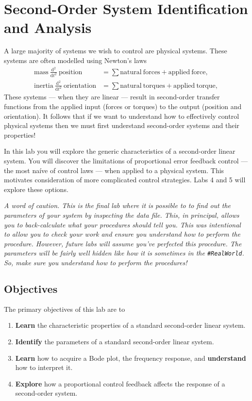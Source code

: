 \chapter{Second-Order System Identification and Analysis}\label{Lab:2}
A large majority of systems we wish to control are physical systems. These
systems are often modelled using Newton's laws
\[
\begin{aligned}
  \mathrm{mass}~\frac{\mathrm d^2}{\mathrm{d}t^2}~\mathrm{position}
    &= \sum \mathrm{natural~forces} + \mathrm{applied~force},\\
  \mathrm{inertia}~\frac{\mathrm d^2}{\mathrm{d}t^2}~\mathrm{orientation}
    &= \sum \mathrm{natural~torques} + \mathrm{applied~torque},
\end{aligned}
\]
These systems --- when
they are linear --- result in second-order transfer functions from the
applied input (forces or torques) to the output (position and orientation).
It follows that if we want to understand how to effectively control physical
systems then we must first understand second-order systems and their
properties!

In this lab you will explore the generic characteristics of a second-order
linear system. You will discover the limitations of proportional error
feedback control --- the most na\'ive of control laws --- when applied to
a physical system. This motivates consideration of
more complicated control strategies. Labs 4 and 5 will explore these options.

\emph{A word of caution. This is the final lab where it is possible to
to find out the parameters of your system by inspecting the data file.
This, in principal, allows you to back-calculate what your procedures should
tell you. This was intentional to allow
you to check your work and ensure you understand how to perform the procedure.
However, future labs will assume you've perfected this procedure.
The parameters will be fairly well hidden like how it is sometimes in the
\texttt{\#RealWorld}. So, make sure you understand how to perform the
procedures!}

\section{Objectives}
The primary objectives of this lab are to
\begin{enumerate}[label=(\arabic*)]
  \item{
    \textbf{Learn} the characteristic properties of a standard second-order linear system.
  }
  \item{
    \textbf{Identify} the parameters of a standard second-order linear system.
  }
  \item{
    \textbf{Learn} how to acquire a Bode plot, the frequency response,
    and \textbf{understand} how to interpret it.
  }
  \item{
    \textbf{Explore} how a proportional control feedback affects the response
    of a second-order system.
  }
\end{enumerate}

